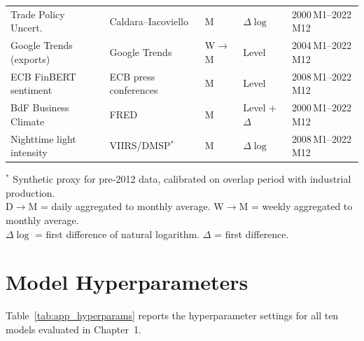 \begin{table}[htbp]
\begin{tabular}{@{} l l l l l @{}}
Trade Policy Uncert. & Caldara--Iacoviello & M & $\Delta\log$ & 2000\,M1--2022\,M12 \\
Google Trends (exports) & Google Trends & W$\to$M & Level & 2004\,M1--2022\,M12 \\
ECB FinBERT sentiment & ECB press conferences & M & Level & 2008\,M1--2022\,M12 \\
BdF Business Climate & FRED & M & Level + $\Delta$ & 2000\,M1--2022\,M12 \\
Nighttime light intensity & VIIRS/DMSP$^*$ & M & $\Delta\log$ & 2008\,M1--2022\,M12 \\
\bottomrule
\end{tabular}
\vspace{0.5em}

\begin{minipage}{\textwidth}
\footnotesize
$^*$ Synthetic proxy for pre-2012 data, calibrated on overlap period with industrial production.\\
D$\to$M = daily aggregated to monthly average.  W$\to$M = weekly aggregated to monthly average.\\
$\Delta\log$ = first difference of natural logarithm.  $\Delta$ = first difference.
\end{minipage}
\end{table}


\section{Model Hyperparameters}
\label{app:hyperparams}

Table~\ref{tab:app_hyperparams} reports the hyperparameter settings for all ten models evaluated in Chapter~1.

